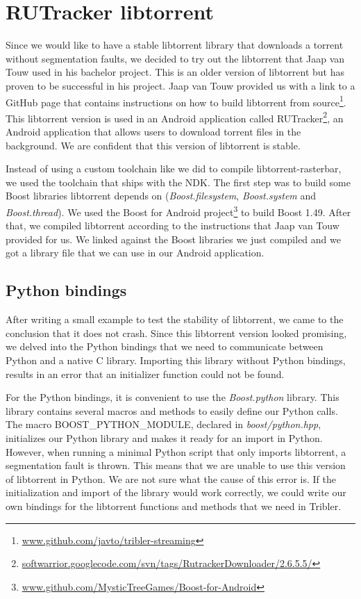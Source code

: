 	\section{RUTracker libtorrent}
		Since we would like to have a stable libtorrent library that downloads a torrent without segmentation faults, we decided to try out the libtorrent that Jaap van Touw used in his bachelor project. This is an older version of libtorrent but has proven to be successful in his project. Jaap van Touw provided us with a link to a GitHub page that contains instructions on how to build libtorrent from source\footnote{\href{https://github.com/javto/tribler-streaming}{www.github.com/javto/tribler-streaming}}. This libtorrent version is used in an Android application called RUTracker\footnote{\href{http://softwarrior.googlecode.com/svn/tags/RutrackerDownloader/2.6.5.5/}{softwarrior.googlecode.com/svn/tags/RutrackerDownloader/2.6.5.5/}}, an Android application that allows users to download torrent files in the background. We are confident that this version of libtorrent is stable.
		
		Instead of using a custom toolchain like we did to compile libtorrent-rasterbar, we used the toolchain that ships with the NDK. The first step was to build some Boost libraries libtorrent depends on (\emph{Boost.filesystem}, \emph{Boost.system} and \emph{Boost.thread}). We used the Boost for Android project\footnote{\href{https://github.com/MysticTreeGames/Boost-for-Android}{www.github.com/MysticTreeGames/Boost-for-Android}} to build Boost 1.49. After that, we compiled libtorrent according to the instructions that Jaap van Touw provided for us. We linked against the Boost libraries we just compiled and we got a library file that we can use in our Android application.
		
		\subsection{Python bindings}
			After writing a small example to test the stability of libtorrent, we came to the conclusion that it does not crash. Since this libtorrent version looked promising, we delved into the Python bindings that we need to communicate between Python and a native C library. Importing this library without Python bindings, results in an error that an initializer function could not be found.
		
			For the Python bindings, it is convenient to use the \emph{Boost.python} library. This library contains several macros and methods to easily define our Python calls. The macro \newline BOOST\_PYTHON\_MODULE, declared in \emph{boost/python.hpp}, initializes our Python library and makes it ready for an import in Python. However, when running a minimal Python script that only imports libtorrent, a segmentation fault is thrown. This means that we are unable to use this version of libtorrent in Python. We are not sure what the cause of this error is. If the initialization and import of the library would work correctly, we could write our own bindings for the libtorrent functions and methods that we need in Tribler.
			
